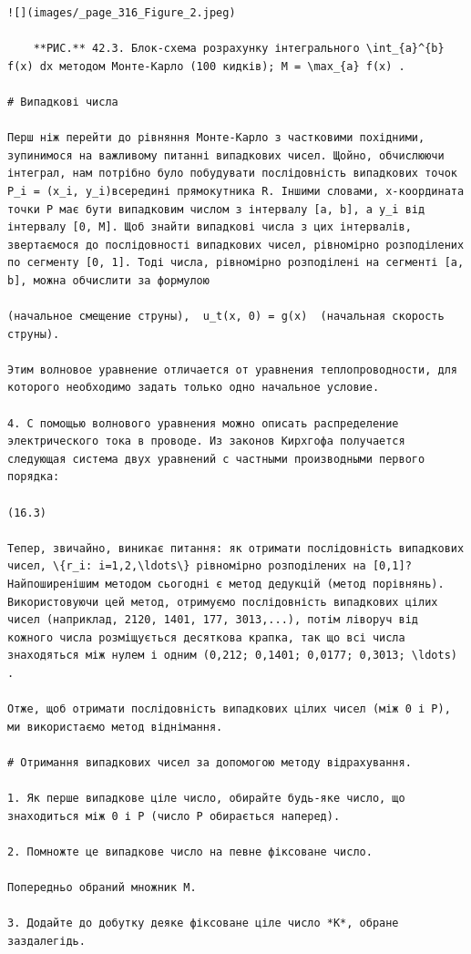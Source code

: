 \documentclass[
  ukrainian,
]{article}
\begin{document}
\begin{verbatim}
![](images/_page_316_Figure_2.jpeg)

    **РИС.** 42.3. Блок-схема розрахунку інтегрального \int_{a}^{b} f(x) dx методом Монте-Карло (100 кидків); M = \max_{a} f(x) .

# Випадкові числа

Перш ніж перейти до рівняння Монте-Карло з частковими похідними, зупинимося на важливому питанні випадкових чисел. Щойно, обчислюючи інтеграл, нам потрібно було побудувати послідовність випадкових точок P_i = (x_i, y_i)всередині прямокутника R. Іншими словами, x-координата точки P має бути випадковим числом з інтервалу [a, b], а y_i від інтервалу [0, M]. Щоб знайти випадкові числа з цих інтервалів, звертаємося до послідовності випадкових чисел, рівномірно розподілених по сегменту [0, 1]. Тоді числа, рівномірно розподілені на сегменті [a, b], можна обчислити за формулою

(начальное смещение струны),  u_t(x, 0) = g(x)  (начальная скорость струны).

Этим волновое уравнение отличается от уравнения теплопроводности, для которого необходимо задать только одно начальное условие.

4. С помощью волнового уравнения можно описать распределение электрического тока в проводе. Из законов Кирхгофа получается следующая система двух уравнений с частными производными первого порядка:

(16.3)

Тепер, звичайно, виникає питання: як отримати послідовність випадкових чисел, \{r_i: i=1,2,\ldots\} рівномірно розподілених на [0,1]? Найпоширенішим методом сьогодні є метод дедукцій (метод порівнянь). Використовуючи цей метод, отримуємо послідовність випадкових цілих чисел (наприклад, 2120, 1401, 177, 3013,...), потім ліворуч від кожного числа розміщується десяткова крапка, так що всі числа знаходяться між нулем і одним (0,212; 0,1401; 0,0177; 0,3013; \ldots) .

Отже, щоб отримати послідовність випадкових цілих чисел (між 0 і P), ми використаємо метод віднімання.

# Отримання випадкових чисел за допомогою методу відрахування.

1. Як перше випадкове ціле число, обирайте будь-яке число, що знаходиться між 0 і P (число P обирається наперед).

2. Помножте це випадкове число на певне фіксоване число.

Попередньо обраний множник M.

3. Додайте до добутку деяке фіксоване ціле число *K*, обране заздалегідь.


\end{verbatim}
\end{document}
